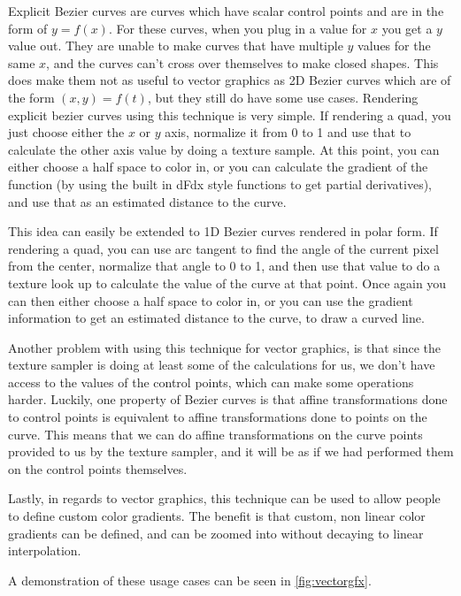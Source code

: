 \documentclass{jcgt}
\begin{document}
Explicit Bezier curves are curves which have scalar control points and are in the form of $y=f(x)$.  For these curves, when you plug in a value for $x$ you get a $y$ value out.  They are unable to make curves that have multiple $y$ values for the same $x$, and the curves can't cross over themselves to make closed shapes.  This does make them not as useful to vector graphics as 2D Bezier curves which are of the form $(x,y) = f(t)$, but they still do have some use cases.  Rendering explicit bezier curves using this technique is very simple.  If rendering a quad, you just choose either the $x$ or $y$ axis, normalize it from 0 to 1 and use that to calculate the other axis value by doing a texture sample.  At this point, you can either choose a half space to color in, or you can calculate the gradient of the function (by using the built in dFdx style functions to get partial derivatives), and use that as an estimated distance to the curve.

This idea can easily be extended to 1D Bezier curves rendered in polar form.  If rendering a quad, you can use arc tangent to find the angle of the current pixel from the center, normalize that angle to 0 to 1, and then use that value to do a texture look up to calculate the value of the curve at that point.  Once again you can then either choose a half space to color in, or you can use the gradient information to get an estimated distance to the curve, to draw a curved line.

Another problem with using this technique for vector graphics, is that since the texture sampler is doing at least some of the calculations for us, we don't have access to the values of the control points, which can make some operations harder.  Luckily, one property of Bezier curves is that affine transformations done to control points is equivalent to affine transformations done to points on the curve.  This means that we can do affine transformations on the curve points provided to us by the texture sampler, and it will be as if we had performed them on the control points themselves.

Lastly, in regards to vector graphics, this technique can be used to allow people to define custom color gradients.  The benefit is that custom, non linear color gradients can be defined, and can be zoomed into without decaying to linear interpolation.

A demonstration of these usage cases can be seen in \autoref{fig:vectorgfx}.

\end{document}
